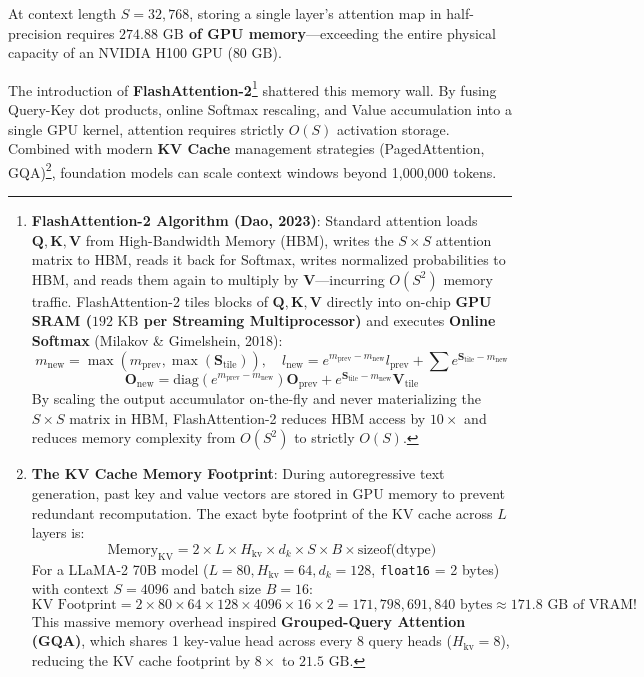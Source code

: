 \documentclass[
  letterpaper,
]{scrbook}
\begin{document}
At context length \(S = 32,768\), storing a single layer's attention map
in half-precision requires \textbf{\(274.88\text{ GB}\) of GPU
memory}---exceeding the entire physical capacity of an NVIDIA H100 GPU
(\(80\text{ GB}\)).

The introduction of \textbf{FlashAttention-2}\footnote{\textbf{FlashAttention-2
  Algorithm (Dao, 2023)}: Standard attention loads
  \(\mathbf{Q}, \mathbf{K}, \mathbf{V}\) from High-Bandwidth Memory
  (HBM), writes the \(S \times S\) attention matrix to HBM, reads it
  back for Softmax, writes normalized probabilities to HBM, and reads
  them again to multiply by \(\mathbf{V}\)---incurring \(O(S^2)\) memory
  traffic. FlashAttention-2 tiles blocks of
  \(\mathbf{Q}, \mathbf{K}, \mathbf{V}\) directly into on-chip
  \textbf{GPU SRAM (\(192\text{ KB}\) per Streaming Multiprocessor)} and
  executes \textbf{Online Softmax} (Milakov \& Gimelshein, 2018):
  \[m_{\text{new}} = \max(m_{\text{prev}}, \max(\mathbf{S}_{\text{tile}})), \quad l_{\text{new}} = e^{m_{\text{prev}} - m_{\text{new}}} l_{\text{prev}} + \sum e^{\mathbf{S}_{\text{tile}} - m_{\text{new}}}\]
  \[\mathbf{O}_{\text{new}} = \text{diag}\left(e^{m_{\text{prev}} - m_{\text{new}}}\right) \mathbf{O}_{\text{prev}} + e^{\mathbf{S}_{\text{tile}} - m_{\text{new}}} \mathbf{V}_{\text{tile}}\]
  By scaling the output accumulator on-the-fly and never materializing
  the \(S \times S\) matrix in HBM, FlashAttention-2 reduces HBM access
  by \(10\times\) and reduces memory complexity from \(O(S^2)\) to
  strictly \(O(S)\).} shattered this memory wall. By fusing Query-Key
dot products, online Softmax rescaling, and Value accumulation into a
single GPU kernel, attention requires strictly \(O(S)\) activation
storage. Combined with modern \textbf{KV Cache} management strategies
(PagedAttention, GQA)\footnote{\textbf{The KV Cache Memory Footprint}:
  During autoregressive text generation, past key and value vectors are
  stored in GPU memory to prevent redundant recomputation. The exact
  byte footprint of the KV cache across \(L\) layers is:
  \[\text{Memory}_{\text{KV}} = 2 \times L \times H_{\text{kv}} \times d_k \times S \times B \times \text{sizeof(dtype)}\]
  For a LLaMA-2 70B model (\(L=80, H_{\text{kv}}=64, d_k=128\),
  \texttt{float16} = 2 bytes) with context \(S=4096\) and batch size
  \(B=16\):
  \[\text{KV Footprint} = 2 \times 80 \times 64 \times 128 \times 4096 \times 16 \times 2 = 171,798,691,840\text{ bytes} \approx 171.8\text{ GB of VRAM!}\]
  This massive memory overhead inspired \textbf{Grouped-Query Attention
  (GQA)}, which shares 1 key-value head across every 8 query heads
  (\(H_{\text{kv}} = 8\)), reducing the KV cache footprint by
  \(8\times\) to \textbf{\(21.5\text{ GB}\)}.}, foundation models can
scale context windows beyond 1,000,000 tokens.
\end{document}
